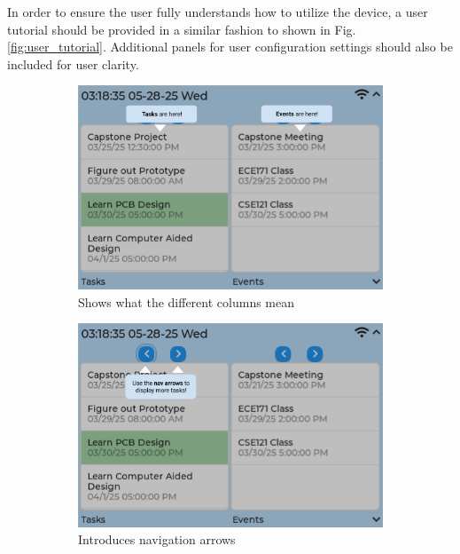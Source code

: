 \documentclass{article}
\begin{document}
In order to ensure the user fully understands how to utilize the device, a user tutorial should be provided in a similar fashion to shown in Fig. \ref{fig:user_tutorial}. Additional panels for user configuration settings should also be included for user clarity.
\begin{figure}[h]
    \begin{subfigure}{0.5\textwidth}
        \includegraphics[width = \textwidth]{task_event.png}
        \caption{Shows what the different columns mean}
    \end{subfigure}
    \begin{subfigure}{0.5\textwidth}
        \includegraphics[width = \textwidth]{nav_arrows.png}
        \caption{Introduces navigation arrows}
    \end{subfigure}
    \begin{subfigure}{0.5\textwidth}

\end{subfigure}
\end{figure}
\end{document}
